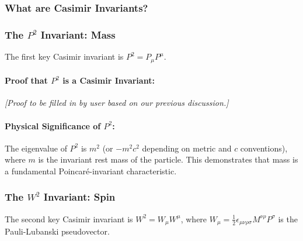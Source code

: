 \documentclass{amsart}
\theoremstyle{definition}
\theoremstyle{remark}
\begin{document}
\subsubsection{What are Casimir Invariants?}
\label{subsubsec:what_are_casimirs}

\subsubsection{The $P^2$ Invariant: Mass}
\label{subsubsec:p_squared_invariant}
The first key Casimir invariant is $P^2 = P_\mu P^\mu$.

\paragraph{Proof that $P^2$ is a Casimir Invariant:}
\textit{[Proof to be filled in by user based on our previous discussion.]}

\paragraph{Physical Significance of $P^2$:}
The eigenvalue of $P^2$ is $m^2$ (or $-m^2 c^2$ depending on metric and $c$ conventions), where $m$ is the invariant rest mass of the particle. This demonstrates that mass is a fundamental Poincaré-invariant characteristic.

\subsubsection{The $W^2$ Invariant: Spin}
\label{subsubsec:w_squared_invariant}
The second key Casimir invariant is $W^2 = W_\mu W^\mu$, where $W_\mu = \frac{1}{2} \epsilon_{\mu\nu\rho\sigma} M^{\nu\rho} P^\sigma$ is the Pauli-Lubanski pseudovector.
\end{document}
